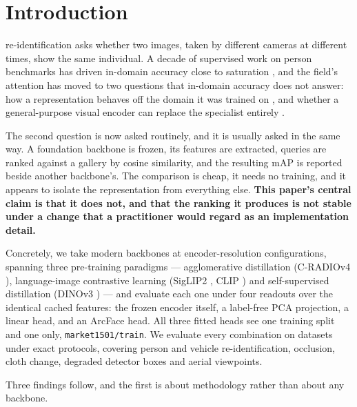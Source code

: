 \section{Introduction}
 re-identification asks whether two images, taken by different cameras
at different times, show the same individual. A decade of supervised work on person
benchmarks has driven in-domain accuracy close to saturation \cite{ye2022deep,zhang2024review},
and the field's attention has moved to two questions that in-domain accuracy does not answer:
how a representation behaves off the domain it was trained on \cite{kim2025dgsurvey}, and
whether a general-purpose visual encoder can replace the specialist entirely
\cite{li2023clipreid,paradigm2026}.

The second question is now asked routinely, and it is usually asked in the same way. A
foundation backbone is frozen, its features are extracted, queries are ranked against a
gallery by cosine similarity, and the resulting mAP is reported beside another backbone's.
The comparison is cheap, it needs no training, and it appears to isolate the representation
from everything else. \textbf{This paper's central claim is that it does not, and that the
ranking it produces is not stable under a change that a practitioner would regard as an
implementation detail.}

Concretely, we take \nEncoders{} modern backbones at \nEncoderConfigs{}
encoder-resolution configurations, spanning three pre-training paradigms --- agglomerative
distillation (C-RADIOv4 \cite{ranzinger2024amradio,heinrich2025radiov25}), language-image
contrastive learning (SigLIP2 \cite{tschannen2025siglip2}, CLIP \cite{radford2021clip}) and
self-supervised distillation (DINOv3 \cite{simeoni2025dinov3}) --- and evaluate each one under
four readouts over the identical cached features: the frozen encoder itself, a label-free PCA
projection, a linear head, and an ArcFace \cite{deng2019arcface} head. All three fitted heads
see one training split and one only, \texttt{market1501/train}. We evaluate every combination
on \nDatasets{} datasets under \nProtocols{} exact protocols, covering person and vehicle
re-identification, occlusion, cloth change, degraded detector boxes and aerial viewpoints.

Three findings follow, and the first is about methodology rather than about any backbone.

